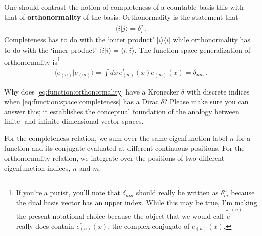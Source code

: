 \documentclass[12pt, oneside]{report}    %
\begin{document}


One should contrast the notion of completeness of a countable basis this with that of \textbf{orthonormality} of the basis. Orthonormality is the statement that
\begin{align}
  \langle i | j \rangle = \delta^j_i \ .
\end{align}
Completeness has to do with the `outer product' $|i\rangle \langle i|$ while orthonormality has to do with the `inner product' $\langle i | i\rangle = \langle i, i\rangle$. The function space generalization of orthonormality is\footnote{If you're a purist, you'll note that $\delta_{nm}$ should really be written as $\delta^n_m$ because the dual basis vector has an upper index. While this may be true, I'm making the present notational choice because the object that we would call $\tilde{\vec{e}}^{(n)}$ really does contain $e_{(n)}^*(x)$, the complex conjugate of $e_{(n)}(x)$.}
\begin{align}
  \langle e_{(n)} | e_{(m)} \rangle = \int dx \, e_{(n)}^*(x) e_{(m)}(x) = \delta_{nm} \ .
  \label{eq:function:orthonormality}
\end{align}
\begin{exercise}
Why does \eqref{eq:function:orthonormality} have a Kronecker $\delta$ with discrete indices when \eqref{eq:function:space:completeness} has a Dirac $\delta$? Please make sure you can answer this; it establishes the conceptual foundation of the analogy between finite- and infinite-dimensional vector spaces.
\end{exercise}
For the completeness relation, we sum over the same eigenfunction label $n$ for a function and its conjugate evaluated at different continuous positions. For the orthonormality relation, we integrate over the positions of two different eigenfunction indices, $n$ and $m$. 
\end{document}
